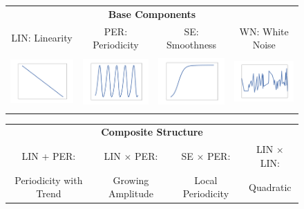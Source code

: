 \begin{subfigure}[b]{0.99\textwidth}\centering
\begin{tabular}{cccc}
\multicolumn{4}{c}{\bf Base Components} \rule{0pt}{3ex} \\ 
\small LIN: Linearity &\small PER: Periodicity &\small SE: Smoothness &\small WN: White Noise \rule{0pt}{2ex} \\
\includegraphics[height=2cm]{figs/kernel/kernelLIN.png} & \includegraphics[height=2cm]{figs/kernel/kernelPER.png} & \includegraphics[height=2cm]{figs/kernel/kernelSE.png} & \includegraphics[height=2cm]{figs/kernel/kernelWN.png}\\
\end{tabular}
\begin{tabular}{cccc}
\multicolumn{4}{c}{\bf Composite Structure} \rule{0pt}{0ex}  \\ 
\small LIN + PER: &\small LIN $\times$ PER: &\small SE $\times$ PER: &\small LIN $\times$ LIN: \rule{0pt}{2ex} \\
\small Periodicity with Trend &\small Growing Amplitude &\small Local Periodicity&\small Quadratic \rule{0pt}{2ex} \\

\end{tabular}
\end{subfigure}
